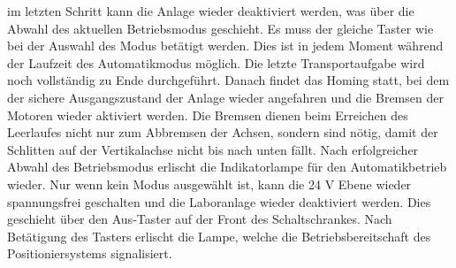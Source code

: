 \documentclass[../../../Bachelorarbeit.tex]{subfiles}
\begin{document}
im letzten Schritt kann die Anlage wieder deaktiviert werden, was über die Abwahl des aktuellen Betriebsmodus geschieht. Es muss der gleiche Taster wie bei der Auswahl des Modus betätigt werden. Dies ist in jedem Moment während der Laufzeit des Automatikmodus möglich. Die letzte Transportaufgabe wird noch vollständig zu Ende durchgeführt. Danach findet das Homing statt, bei dem der sichere Ausgangszustand der Anlage wieder angefahren und die Bremsen der Motoren wieder aktiviert werden. Die Bremsen dienen beim Erreichen des Leerlaufes nicht nur zum Abbremsen der Achsen, sondern sind nötig, damit der Schlitten auf der Vertikalachse nicht bis nach unten fällt. Nach erfolgreicher Abwahl des Betriebsmodus erlischt die Indikatorlampe für den Automatikbetrieb wieder. Nur wenn kein Modus ausgewählt ist, kann die 24 V Ebene wieder spannungsfrei geschalten und die Laboranlage wieder deaktiviert werden. Dies geschieht über den Aus-Taster auf der Front des Schaltschrankes. Nach Betätigung des Tasters erlischt die Lampe, welche die Betriebsbereitschaft des Positioniersystems signalisiert.\\
\end{document}
